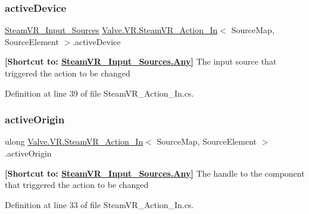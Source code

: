 \subsubsection{\texorpdfstring{activeDevice}{activeDevice}}
{\footnotesize\ttfamily \mbox{\hyperlink{namespace_valve_1_1_v_r_a82e5bf501cc3aa155444ee3f0662853f}{Steam\+V\+R\+\_\+\+Input\+\_\+\+Sources}} \mbox{\hyperlink{class_valve_1_1_v_r_1_1_steam_v_r___action___in}{Valve.\+V\+R.\+Steam\+V\+R\+\_\+\+Action\+\_\+\+In}}$<$ Source\+Map, Source\+Element $>$.active\+Device\hspace{0.3cm}{\ttfamily [get]}}



{\bfseries{\mbox{[}Shortcut to\+: \mbox{\hyperlink{namespace_valve_1_1_v_r_a82e5bf501cc3aa155444ee3f0662853faed36a1ef76a59ee3f15180e0441188ad}{Steam\+V\+R\+\_\+\+Input\+\_\+\+Sources.\+Any}}\mbox{]}}} The input source that triggered the action to be changed 



Definition at line 39 of file Steam\+V\+R\+\_\+\+Action\+\_\+\+In.\+cs.

\mbox{\label{class_valve_1_1_v_r_1_1_steam_v_r___action___in_a78f3e5c201024521dd7f575617f58244}} 
\subsubsection{\texorpdfstring{activeOrigin}{activeOrigin}}
{\footnotesize\ttfamily ulong \mbox{\hyperlink{class_valve_1_1_v_r_1_1_steam_v_r___action___in}{Valve.\+V\+R.\+Steam\+V\+R\+\_\+\+Action\+\_\+\+In}}$<$ Source\+Map, Source\+Element $>$.active\+Origin\hspace{0.3cm}{\ttfamily [get]}}



{\bfseries{\mbox{[}Shortcut to\+: \mbox{\hyperlink{namespace_valve_1_1_v_r_a82e5bf501cc3aa155444ee3f0662853faed36a1ef76a59ee3f15180e0441188ad}{Steam\+V\+R\+\_\+\+Input\+\_\+\+Sources.\+Any}}\mbox{]}}} The handle to the component that triggered the action to be changed 



Definition at line 33 of file Steam\+V\+R\+\_\+\+Action\+\_\+\+In.\+cs.

